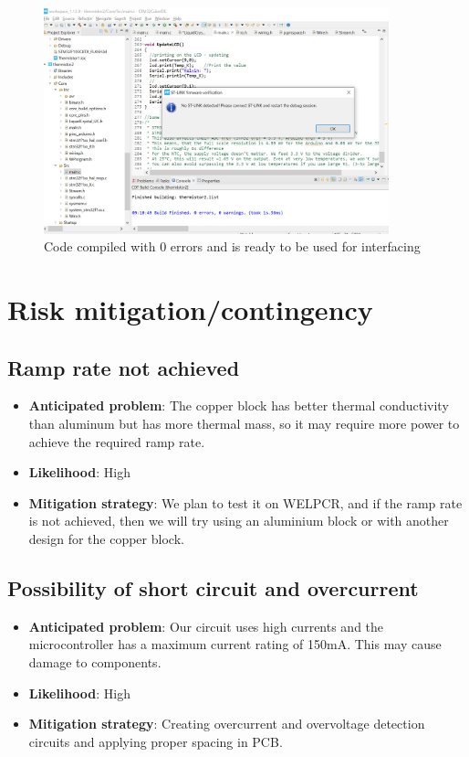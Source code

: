 \documentclass[12pt]{article}
\begin{document}
\begin{figure}[h]
    \centering
    \includegraphics[width=10cm]{Code4.png}
    \caption{Code compiled with 0 errors and is ready to be used for interfacing}
    \label{fig:galaxy}
\end{figure}
\section{Risk mitigation/contingency}
\subsection{Ramp rate not achieved}
\begin{itemize}
    \item \textbf{Anticipated problem}: The copper block has better thermal conductivity than aluminum but has more thermal mass, so it may require more power to achieve the required ramp rate.
\item \textbf{Likelihood}: High
\item \textbf{Mitigation strategy}: We plan to test it on WELPCR, and if the ramp rate is not achieved, then we will try using an aluminium block or with another design for the copper block.
\end{itemize}

\subsection{Possibility of short circuit and overcurrent}
\begin{itemize}
    \item 
\textbf{Anticipated problem}: Our circuit uses high currents and the microcontroller has a maximum current rating of 150mA. This may cause damage to components.
\item \textbf{Likelihood}: High
\item \textbf{Mitigation strategy}: Creating overcurrent and overvoltage detection circuits and applying proper spacing in PCB.
\end{itemize}
\end{document}

